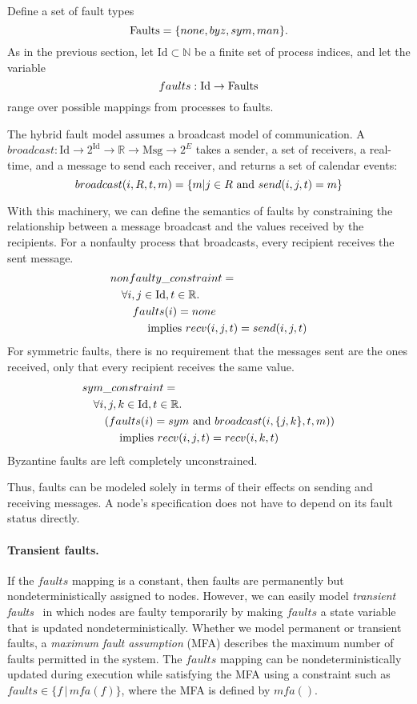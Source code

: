 \documentclass{llncs/llncs}
\newcommand{\Id}{\ensuremath{\mathrm{Id}}}
\newcommand{\Msg}{\ensuremath{\mathrm{Msg}}}
\begin{document}
Define a set of fault types $$\textnormal{Faults} = \{none, byz, sym, man\}.$$ As in the previous section, let $\Id \subset \mathbb{N}$ be a finite set of process indices, and let the variable $$faults: \Id \rightarrow \textnormal{Faults}$$ range over possible mappings from processes to faults.

The hybrid fault model assumes a broadcast model of communication.
A $broadcast: \Id \rightarrow 2^{\Id} \rightarrow \mathbb{R} \rightarrow \Msg \rightarrow 2^{E}$ takes a sender, a set of receivers, a real-time, and a message to send each receiver, and returns a set of calendar events:
$$broadcast(i, R, t, m) = \{m | j \in R \textnormal{ and } send(i, j, t) = m\}$$

With this machinery, we can define the semantics of faults by constraining the relationship between a message broadcast and the values received by the recipients. For a nonfaulty process that broadcasts, every recipient receives the sent message.
\begin{align*}
&nonfaulty\_constraint =\\
  &\quad \forall i, j \in \Id, t \in \mathbb{R}.\\
  &\quad\quad faults(i) = none\\
  &\quad\quad\quad \textnormal{ implies } recv(i, j, t) = send(i, j, t)
\end{align*}
\noindent
For symmetric faults, there is no requirement that the messages sent are the ones received, only that every recipient receives the same value.
\begin{align*}
&sym\_constraint =\\
  &\quad \forall i, j, k \in \Id, t \in \mathbb{R}.\\
  &\quad\quad (faults(i) = sym \textnormal{ and } broadcast(i, \{j, k\}, t, m))\\
  &\quad\quad\quad \textnormal{ implies } recv(i, j, t) = recv(i, k, t)
\end{align*}
\noindent
Byzantine faults are left completely unconstrained.

Thus, faults can be modeled solely in terms of their effects on sending and receiving messages. A node's specification does not have to depend on its fault status directly.

\paragraph{Transient faults.} If the $faults$ mapping is a constant, then faults are permanently but nondeterministically assigned to nodes. However, we can easily model \emph{transient faults}~\cite{} in which nodes are faulty temporarily by making $faults$ a state variable that is updated nondeterministically. Whether we model permanent or transient faults, a \emph{maximum fault assumption} (MFA) describes the maximum number of faults permitted in the system. The $faults$ mapping can be nondeterministically updated during execution while satisfying the MFA using a constraint such as $faults \in \{f \, | \, mfa(f) \}$, where the MFA is defined by $mfa()$.
\end{document}
